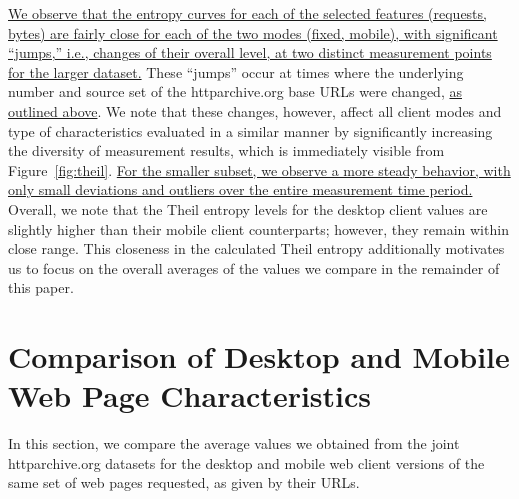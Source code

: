 \documentclass[onecolumn,12pt]{IEEEtran}
\begin{document}
\uline{We observe that the entropy curves for each of the selected features (requests, bytes) are fairly close for each of the two modes (fixed, mobile), with significant ``jumps,'' i.e., changes of their overall level, at two distinct measurement points for the larger dataset.} 
These ``jumps'' occur at times where the underlying number and source set of the httparchive.org base URLs were changed, \uline{as outlined above}.
We note that these changes, however, affect all client modes and type of characteristics evaluated in a similar manner by significantly increasing the diversity of measurement results, which is immediately visible from Figure~\ref{fig:theil}.
\uline{For the smaller subset, we observe a more steady behavior, with only small deviations and outliers over the entire measurement time period.}
Overall, we note that the Theil entropy levels for the desktop client values are slightly higher than their mobile client counterparts; however, they remain within close range.
This closeness in the calculated Theil entropy additionally motivates us to focus on the overall averages of the values we compare in the remainder of this paper.


\section{Comparison of Desktop and Mobile Web Page Characteristics}
\label{s:compare}
In this section, we compare the average values we obtained from the joint httparchive.org datasets for the desktop and mobile web client versions of the same set of web pages requested, as given by their URLs.
\end{document}
